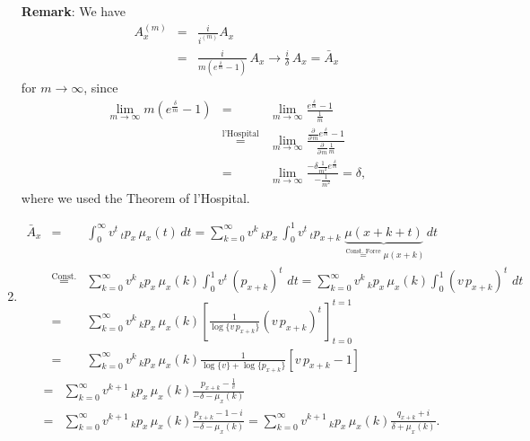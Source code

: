 \documentclass[11pt,fleqn,oneside]{book}
\begin{document}
\begin{enumerate}
\noindent \textbf{Remark}: We have
\begin{eqnarray*}
{A_x^{(m)}} &=& \frac{i}{i^{(m)}} {A_x} \\
&=& \frac{i}{m\left(e^{\frac{\delta}{m}} - 1 \right)}\,{A_x} \rightarrow \frac{i}{\delta}\, {A_x} = \bar{A}_x
\end{eqnarray*}
for $m \longrightarrow \infty$, since
\begin{eqnarray*}
\lim_{m\rightarrow \infty} m\left(e^{\frac{\delta}{m}} - 1 \right) &=& \lim_{m\rightarrow \infty} \frac{e^{\frac{\delta}{m}} - 1}{\frac{1}{m}}\\
&\stackrel{\text{l'Hospital}}{=}& \lim_{m\rightarrow \infty} \frac{\frac{\partial}{\partial \, m}e^{\frac{\delta}{m}} - 1}{\frac{\partial}{\partial\,m}\frac{1}{m}}\\
&=&  \lim_{m\rightarrow \infty}  \frac{-\delta \frac{1}{m^2}e^{\frac{\delta}{m}}}{-\frac{1}{m^2}} = \delta,
\end{eqnarray*} 
where we used the Theorem of l'Hospital. 

\item
\begin{eqnarray*}
{\bar{A}_x} &=& \int_0^{\infty} v^t\,{_tp_x}\,\mu_x(t)\,dt 
= \sum_{k=0}^{\infty} v^k\,{_kp_x}\,\int_0^1 v^t\,{_tp_{x+k}}\, \underbrace{\mu(x+k+t)}_{\stackrel{\text{Const.\ Force}}{=}\mu(x+k)}\,dt\\
&\stackrel{\text{Const.\ Force}}{=}& \sum_{k=0}^{\infty} v^k\,{_kp_x}\,\mu_x(k) \int_0^1 v^t\,\left({p_{x+k}}\right)^t\, \,dt = \sum_{k=0}^{\infty} v^k\,{_kp_x}\,\mu_x(k) \int_0^1 \left(v\,{p_{x+k}}\right)^t\, \,dt \\
&=& \sum_{k=0}^{\infty} v^k\,{_kp_x}\,\mu_x(k) \left[\frac{1}{\log\{v\,p_{x+k}\}} \left(v\,{p_{x+k}}\right)^t\, \right]_{t=0}^{t=1} \\
&=&  \sum_{k=0}^{\infty} v^k\,{_kp_x}\,\mu_x(k) \frac{1}{\log\{v\}+\log\{p_{x+k}\}}\left[ v\,{p_{x+k}} - 1 \right] 
 \end{eqnarray*}
 \begin{eqnarray*}
&=& \sum_{k=0}^{\infty} v^{k+1}\,{_kp_x}\,\mu_x(k) \frac{{p_{x+k}} - \frac{1}{v}}{-\delta - \mu_x(k)} \\
&=& \sum_{k=0}^{\infty} v^{k+1}\,{_kp_x}\,\mu_x(k) \frac{{p_{x+k}} - 1 - i}{-\delta - \mu_x(k)} 
=  \sum_{k=0}^{\infty} v^{k+1}\,{_kp_x}\,\mu_x(k) \frac{{q_{x+k}} + i}{\delta + \mu_x(k)}. 
\end{eqnarray*}


\end{enumerate}
\end{document}
